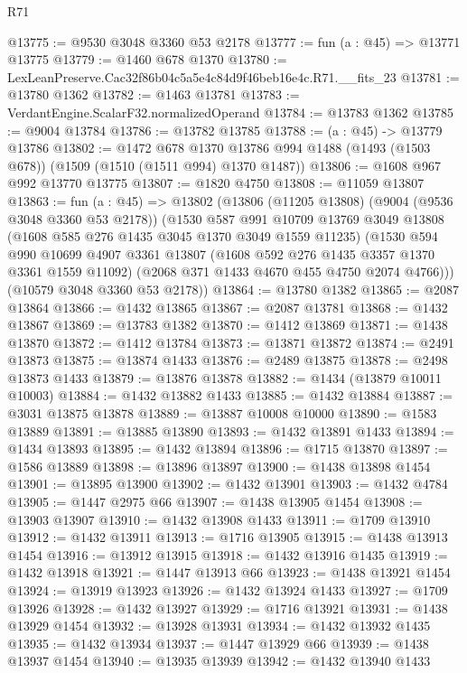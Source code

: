 \begin{lexlean}{R71}
\begin{coremodule}
@13775 := @9530 @3048 @3360 @53 @2178
@13777 := fun (a : @45) => @13771 @13775
@13779 := @1460 @678 @1370
@13780 := LexLeanPreserve.Cac32f86b04c5a5e4c84d9f46beb16e4c.R71.__fits_23
@13781 := @13780 @1362
@13782 := @1463 @13781
@13783 := VerdantEngine.ScalarF32.normalizedOperand
@13784 := @13783 @1362
@13785 := @9004 @13784
@13786 := @13782 @13785
@13788 := (a : @45) -> @13779 @13786
@13802 := @1472
    @678
    @1370
    @13786
    @994
    @1488
    (@1493 (@1503 @678))
    (@1509 (@1510 (@1511 @994) @1370 @1487))
@13806 := @1608 @967 @992 @13770 @13775
@13807 := @1820 @4750
@13808 := @11059 @13807
@13863 := fun (a : @45) =>
  @13802
    (@13806
      (@11205 @13808)
      (@9004 (@9536 @3048 @3360 @53 @2178))
      (@1530
        @587
        @991
        @10709
        @13769
        @3049
        @13808
        (@1608 @585 @276 @1435 @3045 @1370 @3049 @1559 @11235)
        (@1530
          @594
          @990
          @10699
          @4907
          @3361
          @13807
          (@1608 @592 @276 @1435 @3357 @1370 @3361 @1559 @11092)
          (@2068 @371 @1433 @4670 @455 @4750 @2074 @4766)))
      (@10579 @3048 @3360 @53 @2178))
@13864 := @13780 @1382
@13865 := @2087 @13864
@13866 := @1432 @13865
@13867 := @2087 @13781
@13868 := @1432 @13867
@13869 := @13783 @1382
@13870 := @1412 @13869
@13871 := @1438 @13870
@13872 := @1412 @13784
@13873 := @13871 @13872
@13874 := @2491 @13873
@13875 := @13874 @1433
@13876 := @2489 @13875
@13878 := @2498 @13873 @1433
@13879 := @13876 @13878
@13882 := @1434 (@13879 @10011 @10003)
@13884 := @1432 @13882 @1433
@13885 := @1432 @13884
@13887 := @3031 @13875 @13878
@13889 := @13887 @10008 @10000
@13890 := @1583 @13889
@13891 := @13885 @13890
@13893 := @1432 @13891 @1433
@13894 := @1434 @13893
@13895 := @1432 @13894
@13896 := @1715 @13870
@13897 := @1586 @13889
@13898 := @13896 @13897
@13900 := @1438 @13898 @1454
@13901 := @13895 @13900
@13902 := @1432 @13901
@13903 := @1432 @4784
@13905 := @1447 @2975 @66
@13907 := @1438 @13905 @1454
@13908 := @13903 @13907
@13910 := @1432 @13908 @1433
@13911 := @1709 @13910
@13912 := @1432 @13911
@13913 := @1716 @13905
@13915 := @1438 @13913 @1454
@13916 := @13912 @13915
@13918 := @1432 @13916 @1435
@13919 := @1432 @13918
@13921 := @1447 @13913 @66
@13923 := @1438 @13921 @1454
@13924 := @13919 @13923
@13926 := @1432 @13924 @1433
@13927 := @1709 @13926
@13928 := @1432 @13927
@13929 := @1716 @13921
@13931 := @1438 @13929 @1454
@13932 := @13928 @13931
@13934 := @1432 @13932 @1435
@13935 := @1432 @13934
@13937 := @1447 @13929 @66
@13939 := @1438 @13937 @1454
@13940 := @13935 @13939
@13942 := @1432 @13940 @1433

\end{coremodule}
\end{lexlean}
